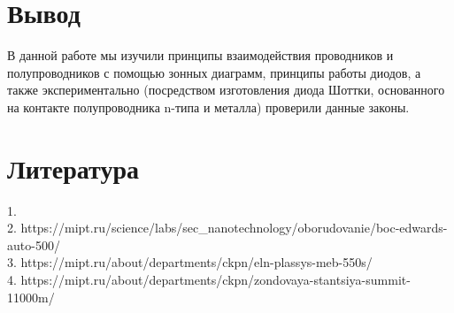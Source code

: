 \documentclass[a4paper]{article}
\begin{document}
\section{Вывод}

В данной работе мы изучили принципы взаимодействия проводников и полупроводников с помощью зонных диаграмм, принципы работы диодов, а также экспериментально (посредством изготовления диода Шоттки, основанного на контакте полупроводника n-типа и металла) проверили данные законы.

\section{Литература}
1. \\
2. https://mipt.ru/science/labs/sec\_nanotechnology/oborudovanie/boc-edwards-auto-500/ \\
3. https://mipt.ru/about/departments/ckpn/eln-plassys-meb-550s/ \\
4. https://mipt.ru/about/departments/ckpn/zondovaya-stantsiya-summit-11000m/ \\
\end{document}
